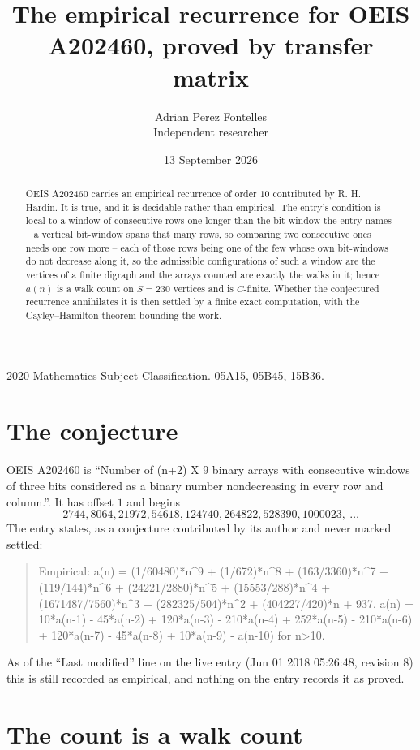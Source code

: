\documentclass[11pt,a4paper]{article}
\title{The empirical recurrence for OEIS A202460, proved by transfer matrix}
\author{Adrian Perez Fontelles\\ \small Independent researcher}
\date{13 September 2026}
\theoremstyle{plain}
\theoremstyle{definition}
\begin{document}
\maketitle

\begin{abstract}
OEIS A202460 carries an empirical recurrence of order $10$ contributed by R. H. Hardin. It is
true, and it is decidable rather than empirical. The entry's condition is local to a window of consecutive rows one longer than the bit-window the entry names -- a vertical bit-window spans that many rows, so comparing two consecutive ones needs one row more -- each of those rows being one of the few whose own bit-windows do not decrease along it, so
the admissible configurations of such a window are the vertices of a finite digraph and the
arrays counted are exactly the walks in it; hence $a(n)$ is a walk count on $S=230$ vertices
and is $C$-finite. Whether the conjectured recurrence annihilates it is then settled by a
finite exact computation, with the Cayley--Hamilton theorem bounding the work.
\end{abstract}

\noindent\small 2020 Mathematics Subject Classification. 05A15, 05B45, 15B36.\normalsize

\section{The conjecture}

OEIS A202460 is ``Number of (n+2) X 9 binary arrays with consecutive windows of three bits considered as a binary number nondecreasing in every row and column.''. It has offset $1$ and begins
\[
2744, 8064, 21972, 54618, 124740, 264822, 528390, 1000023,\ \dots
\]
The entry states, as a conjecture contributed by its author and never marked settled:
\begin{quote}
Empirical: a(n) = (1/60480)*n\^{}9 + (1/672)*n\^{}8 + (163/3360)*n\^{}7 + (119/144)*n\^{}6 + (24221/2880)*n\^{}5 + (15553/288)*n\^{}4 + (1671487/7560)*n\^{}3 + (282325/504)*n\^{}2 + (404227/420)*n + 937. a(n) = 10*a(n-1) - 45*a(n-2) + 120*a(n-3) - 210*a(n-4) + 252*a(n-5) - 210*a(n-6) + 120*a(n-7) - 45*a(n-8) + 10*a(n-9) - a(n-10) for n>10.
\end{quote}
As of the ``Last modified'' line on the live entry (Jun 01 2018 05:26:48, revision 8) this is still
recorded as empirical, and nothing on the entry records it as proved.

\section{The count is a walk count}
\end{document}
